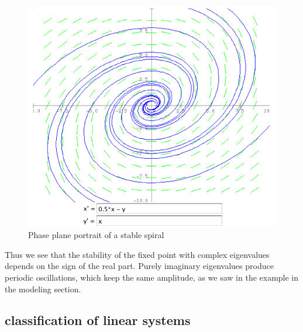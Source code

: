 \documentclass[
  letterpaper,
  DIV=11,
  numbers=noendperiod]{scrreprt}
\begin{document}
\begin{figure}

{\centering \includegraphics{./images/lec7_pp1.png}

}

\caption{Phase plane portrait of a stable spiral}

\end{figure}

Thus we see that the stability of the fixed point with complex
eigenvalues depends on the sign of the real part. Purely imaginary
eigenvalues produce periodic oscillations, which keep the same
amplitude, as we saw in the example in the modeling section.

\hypertarget{classification-of-linear-systems-1}{%
\subsection{classification of linear
systems}\label{classification-of-linear-systems-1}}
\end{document}
